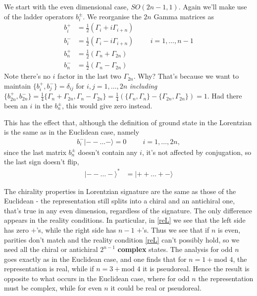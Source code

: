 \documentclass[a4paper,12pt]{article}
\numberwithin{equation}{section}
\numberwithin{exe}{section}
\newcommand{\G}{{\Gamma}}
\newcommand{\ket}[1]{| #1 \rangle}
\begin{document}
\bigskip

We start with the even dimensional case, $SO(2n-1,1)$. Again we'll make use of the ladder operators $b_i^\pm$. We reorganise the $2n$ Gamma matrices as
	\begin{align}\label{bi2}
	b_i^+ &=\frac{1}{2} \left( \G_i + i \G_{i+n} \right)\\
	b_i^- &=\frac{1}{2} \left( \G_i - i \G_{i+n} \right)\hspace{1cm}i=1,\hdots,n-1\\
	b_n^+&=\frac{1}{2} \left( \G_n+\G_{2n} \right)\\
	b_n^-&=\frac{1}{2} \left( \G_n-\G_{2n} \right)
	\end{align}
Note there's no $i$ factor in the last two $\G_{2n}$. Why? That's because we want to maintain $\{ b_i^+,b_j^- \}=\delta_{ij}$ for $i,j=1,\hdots,2n$ \textit{including} $\{ b_{2n}^+,b_{2n}^- \}=\frac{1}{4}\{ \G_n+\G_{2n} , \G_n - \G_{2n} \}= \frac{1}{4} \left( \{ \G_n,\G_n \} - \{ \G_{2n},\G_{2n} \} \right)=1$. Had there been an $i$ in the $b_n^\pm$, this would give zero instead.

This has the effect that, although the definition of ground state in the Lorentzian is the same as in the Euclidean case, namely
	\begin{align}\label{}
	b_i^-\ket{--\hdots -}=0 \hspace{1cm} i=1,\hdots,2n ,
	\end{align}
since the last matrix $b_n^\pm$ doesn't contain any $i$, it's not affected by conjugation, so the last sign doesn't flip,
	\begin{align}\label{reL}
	\ket{--\hdots-}^*&=\ket{++\hdots +-}
	\end{align}

The chirality properties in Lorentzian signature are the same as those of the Euclidean - the representation still splits into a chiral and an antichiral one, that's true in any even dimension, regardless of the signature. The only difference appears in the reality conditions. In particular, in \eqref{reL} we see that the left side has zero $+$'s, while the right side has $n-1$ $+$'s. Thus we see that if $n$ is even, parities don't match and the reality condition \eqref{reL} can't possibly hold, so we need all the chiral or antichiral $2^{n-1}$ \textbf{complex} states. The analysis for odd $n$ goes exactly as in the Euclidean case, and one finds that for $n=1+\mbox{mod } 4$, the representation is real, while if $n=3+\mbox{mod }4$ it is pseudoreal. Hence the result is opposite to what occurs in the Euclidean case, where for odd $n$ the representation must be complex, while for even $n$ it could be real or pseudoreal.  
\end{document}
